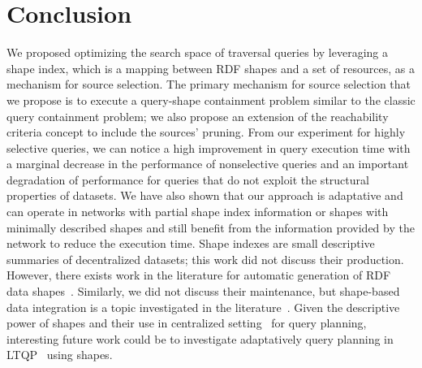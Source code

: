 \section{Conclusion}

We proposed optimizing the search space of traversal queries by leveraging a shape index, which is a mapping between RDF shapes and a set of resources, as a mechanism for source selection.
The primary mechanism for source selection that we propose is to execute a query-shape containment problem similar to the classic query containment problem; we also 
propose an extension of the reachability criteria concept to include the sources' pruning.
From our experiment for highly selective queries, we can notice a high improvement in query execution time with a marginal decrease in the performance of nonselective queries 
and an important degradation of performance for queries that do not exploit the structural properties of datasets.
We have also shown that our approach is adaptative and can operate in networks with partial shape index information or shapes with minimally described shapes and still benefit
from the information provided by the network to reduce the execution time.
Shape indexes are small descriptive summaries of decentralized datasets; this work did not discuss their production.
However, there exists work in the literature for automatic generation of RDF data shapes~\cite{fernandez2023extracting}.
Similarly, we did not discuss their maintenance, but shape-based data integration is a topic investigated in the literature~\cite {LabraGayo2023}.
Given the descriptive power of shapes and their use in centralized setting~\cite{kashif2021} for query planning, interesting future work could be to investigate adaptatively
query planning in LTQP~\cite{taelman2024towards} using shapes.   